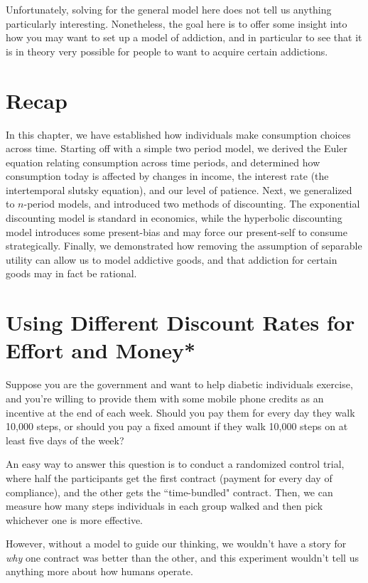 Unfortunately, solving for the general model here does not tell us anything particularly interesting. Nonetheless, the goal here is to offer some insight into how you may want to set up a model of addiction, and in particular to see that it is in theory very possible for people to want to acquire certain addictions.

\section*{Recap}
In this chapter, we have established how individuals make consumption choices across time. Starting off with a simple two period model, we derived the Euler equation relating consumption across time periods, and determined how consumption today is affected by changes in income, the interest rate (the intertemporal slutsky equation), and our level of patience. Next, we generalized to $n$-period models, and introduced two methods of discounting. The exponential discounting model is standard in economics, while the hyperbolic discounting model introduces some present-bias and may force our present-self to consume strategically. Finally, we demonstrated how removing the assumption of separable utility can allow us to model addictive goods, and that addiction for certain goods may in fact be rational. 

\section{Using Different Discount Rates for Effort and Money*}

Suppose you are the government and want to help diabetic individuals exercise, and you're willing to provide them with some mobile phone credits as an incentive at the end of each week. Should you pay them for every day they walk 10,000 steps, or should you pay a fixed amount if they walk 10,000 steps on at least five days of the week? 

An easy way to answer this question is to conduct a randomized control trial, where half the participants get the first contract (payment for every day of compliance), and the other gets the ``time-bundled" contract. Then, we can measure how many steps individuals in each group walked and then pick whichever one is more effective.

However, without a model to guide our thinking, we wouldn't have a story for \textit{why} one contract was better than the other, and this experiment wouldn't tell us anything more about how humans operate. 

